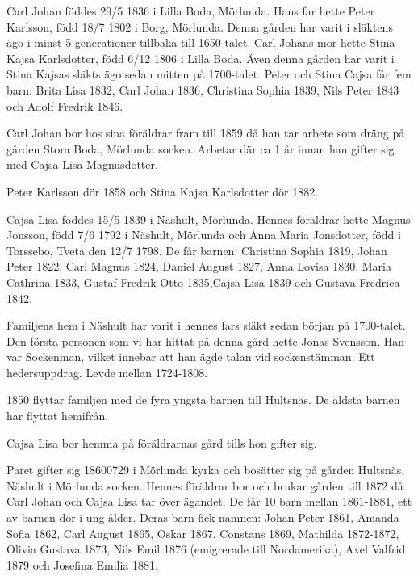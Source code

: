 





Carl Johan föddes 29/5 1836 i Lilla Boda, Mörlunda. 
Hans far hette Peter Karlsson, född 18/7 1802 i Borg, Mörlunda. 
Denna gården har varit i släktens ägo i minst 5 generationer tillbaka till 1650-talet. Carl Johans mor hette Stina Kajsa Karlsdotter, född 6/12 1806 i Lilla Boda. Även denna gården har varit i Stina Kajsas släkts ägo sedan mitten på 1700-talet.
Peter och Stina Cajsa får fem barn: Brita Lisa 1832, Carl Johan 1836, Christina Sophia 1839, Nils Peter 1843 och Adolf Fredrik 1846.

Carl Johan bor hos sina föräldrar fram till 1859 då han tar arbete som dräng på gården Stora Boda, Mörlunda socken. Arbetar där ca 1 år innan han gifter sig med Cajsa Lisa Magnusdotter.

Peter Karlsson dör 1858 och Stina Kajsa Karlsdotter dör 1882.



Cajsa Lisa föddes 15/5 1839 i Näshult, Mörlunda. Hennes föräldrar hette Magnus Jonsson, född 7/6 1792 i Näshult, Mörlunda och Anna Maria Jonsdotter, född i Torssebo, Tveta den 12/7 1798.
De får barnen: Christina Sophia 1819, Johan Peter 1822, Carl Magnus 1824, Daniel August 1827, Anna Lovisa 1830, Maria Cathrina 1833, Gustaf Fredrik Otto 1835,Cajsa Lisa 1839 och Gustava Fredrica 1842.
 
Familjens hem i Näshult har varit i hennes fars släkt sedan början på 1700-talet.
Den första personen som vi har hittat på denna gård hette Jonas Svensson. Han var Sockenman,  vilket innebar att han ägde talan vid sockenstämman. Ett hedersuppdrag.
Levde mellan 1724-1808.

1850 flyttar familjen med de fyra yngsta barnen till Hultsnäs. De äldsta barnen har flyttat hemifrån.

Cajsa Lisa bor hemma på föräldrarnas gård tills hon gifter sig.




Paret gifter sig 18600729 i Mörlunda kyrka och bosätter sig på gården Hultsnäs, Näshult i Mörlunda socken. Hennes föräldrar bor och brukar gården till 1872 då Carl Johan och Cajsa Lisa tar över ägandet.
De får 10 barn mellan 1861-1881, ett av barnen dör i ung ålder.
Deras barn fick namnen: Johan Peter 1861, Amanda Sofia 1862, Carl August 1865, Oskar 1867, Constans 1869, Mathilda 1872-1872, Olivia Gustava 1873, Nils Emil 1876 (emigrerade till Nordamerika), Axel Valfrid 1879 och Josefina Emilia 1881.


